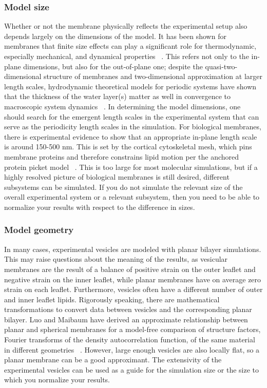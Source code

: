 \documentclass[9pt,bestpractices,pubversion]{livecoms}
\begin{document}
\subsubsection{Model size}
\label{subsubsec:size}
Whether or not the membrane physically reflects the experimental setup also depends largely on the dimensions of the model.
It has been shown for membranes that finite size effects can play a significant role for thermodynamic, especially mechanical, and dynamical properties ~\cite{Castro-Roman2006,Waheed2009,Venable2015,Venable2017}.
This refers not only to the in-plane dimensions, but also for the out-of-plane one; despite the quasi-two-dimensional structure of membranes and two-dimensional approximation at larger length scales, hydrodynamic theoretical models for periodic systems have shown that the thickness of the water layer(s) matter as well in convergence to macroscopic system dynamics ~\cite{Venable2017}.
In determining the model dimensions, one should search for the emergent length scales in the experimental system that can serve as the periodicity length scales in the simulation.
For biological membranes, there is experimental evidence to show that an appropriate in-plane length scale is around 150-500 nm.
This is set by the cortical cytoskeletal mesh, which pins membrane proteins and therefore constrains lipid motion per the anchored protein picket model ~\cite{Ritchie2003,Morone2006}.
This is too large for most molecular simulations, but if a highly resolved picture of biological membranes is still desired, different subsystems can be simulated.
If you do not simulate the relevant size of the overall experimental system or a relevant subsystem, then you need to be able to normalize your results with respect to the difference in sizes.

\subsubsection{Model geometry}
\label{subsubsec:geometry}
In many cases, experimental vesicles are modeled with planar bilayer simulations.
This may raise questions about the meaning of the results, as vesicular membranes are the result of a balance of positive strain on the outer leaflet and negative strain on the inner leaflet, while planar membranes have on average zero strain on each leaflet.
Furthermore, vesicles often have a different number of outer and inner leaflet lipids.
Rigorously speaking, there are mathematical transformations to convert data between vesicles and the corresponding planar bilayer.
Luo and Maibaum have derived an approximate relationship between planar and spherical membranes for a model-free comparison of structure factors, Fourier transforms of the density autocorrelation function, of the same material in different geometries ~\cite{Luo2018}.
However, large enough vesicles are also locally flat, so a planar membrane can be a good approximant.
The extensivity of the experimental vesicles can be used as a guide for the simulation size or the size to which you normalize your results.
\end{document}
